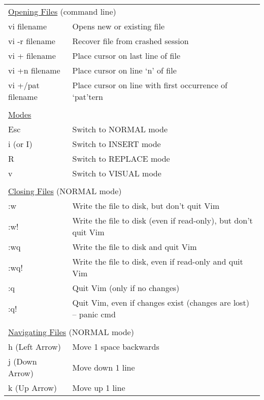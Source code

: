 \documentclass[11pt,a4paper,oneside]{article}
\begin{document}

\begin{table}
\begin{tabular}{p{5.5cm} l}
\multicolumn{2}{l}{\underline{Opening Files} (command line)} \\
vi filename & Opens new or existing file \\
vi -r filename & Recover file from crashed session \\
vi + filename & Place cursor on last line of file \\
vi +n filename & Place cursor on line `n' of file \\
vi +/pat filename & Place cursor on line with first occurrence of `pat'tern \\
 & \\[-1.5ex]
\multicolumn{2}{l}{\underline{Modes}} \\
 Esc & Switch to NORMAL mode \\
 i (or I) & Switch to INSERT mode \\
 R & Switch to REPLACE mode \\
 v & Switch to VISUAL mode \\
 & \\[-1.5ex]
\multicolumn{2}{l}{\underline{Closing Files} (NORMAL mode)} \\
:w & Write the file to disk, but don't quit Vim \\
:w! & Write the file to disk (even if read-only), but don't quit Vim \\
:wq & Write the file to disk and quit Vim \\
:wq! & Write the file to disk, even if read-only and quit Vim\\
:q & Quit Vim (only if no changes) \\
:q! & Quit Vim, even if changes exist (changes are lost) -- panic cmd \\
 & \\[-1.5ex]
\multicolumn{2}{l}{\underline{Navigating Files} (NORMAL mode)} \\
h (Left Arrow) & Move 1 space backwards \\
j (Down Arrow) & Move down 1 line \\
k (Up Arrow) & Move up 1 line \\

\end{tabular}
\end{table}
\end{document}
